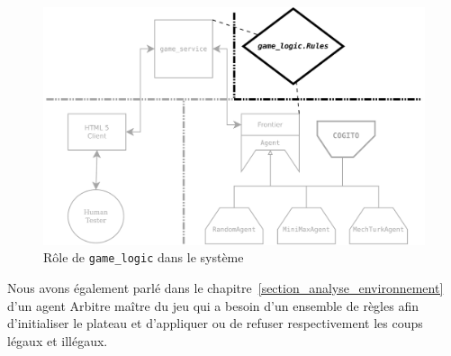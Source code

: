 \begin{figure}[H] 
\centering
\includegraphics[width=\textwidth]{files/william/archi_lib} 
\caption{Rôle de \texttt{\gls{game_logic}} dans le système} 
\end{figure}

Nous avons également parlé dans le chapitre~\ref{section_analyse_environnement} d'un agent \og Arbitre \fg{} maître du jeu qui a besoin d'un ensemble de règles afin d'initialiser le plateau et d'appliquer ou de refuser respectivement les coups légaux et illégaux.

